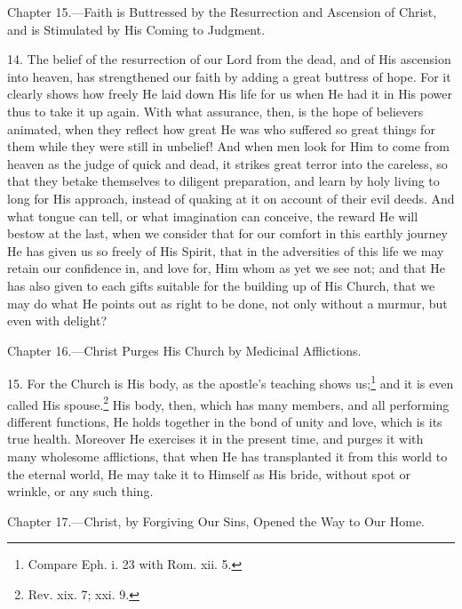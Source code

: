 
Chapter 15.—Faith is Buttressed by the Resurrection and Ascension of Christ, and is Stimulated by His Coming to Judgment.

14. The belief of the resurrection of our Lord from the dead, and of His ascension into heaven, has strengthened our faith by adding a great buttress of hope. For it clearly shows how freely He laid down His life for us when He had it in His power thus to take it up again. With what assurance, then, is the hope of believers animated, when they reflect how great He was who suffered so great things for them while they were still in unbelief! And when men look for Him to come from heaven as the judge of quick and dead, it strikes great terror into the careless, so that they betake themselves to diligent preparation, and learn by holy living to long for His approach, instead of quaking at it on account of their evil deeds. And what tongue can tell, or what imagination can conceive, the reward He will bestow at the last, when we consider that for our comfort in this earthly journey He has given us so freely of His Spirit, that in the adversities of this life we may retain our confidence in, and love for, Him whom as yet we see not; and that He has also given to each gifts suitable for the building up of His Church, that we may do what He points out as right to be done, not only without a murmur, but even with delight?


Chapter 16.—Christ Purges His Church by Medicinal Afflictions.

15. For the Church is His body, as the apostle’s teaching shows us;\footnote{Compare Eph. i. 23 with Rom. xii. 5.} and it is even called His spouse.\footnote{Rev. xix. 7; xxi. 9.} His body, then, which has many members, and all performing different functions, He holds together in the bond of unity and love, which is its true health. Moreover He exercises it in the present time, and purges it with many wholesome afflictions, that when He has transplanted it from this world to the eternal world, He may take it to Himself as His bride, without spot or wrinkle, or any such thing.


Chapter 17.—Christ, by Forgiving Our Sins, Opened the Way to Our Home.

